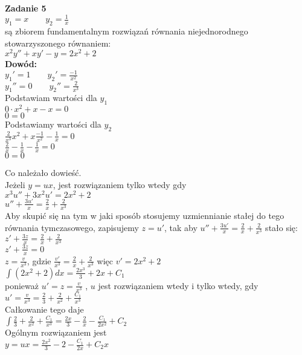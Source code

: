 \documentclass[10pt,a4paper]{article}
\begin{document}
	\newpage

	\textbf{Zadanie 5} \\
	$y_{1} = x \qquad y_{2} = \frac{1}{x} $ \\
	są zbiorem fundamentalnym rozwiązań równania niejednorodnego stowarzyszonego równaniem: \\
	$x^2y'' + xy' - y = 2x^2 + 2 $ \\
	
	\textbf{Dowód:} \\
	$y_{1}' = 1 \qquad y_{2}' = \frac{-1}{x^2} $ \\
	$y_{1}'' = 0 \qquad y_{2}'' = \frac{2}{x^3} $ \\ 
	
	Podstawiam  wartości dla $y_{1} $ \\
	$0 \cdot x^2 + x - x = 0$ \\
	$ 0 = 0 $\\
	Podstawiamy wartości dla $y_{2}$ \\
	$\frac{2}{x^3}x^2 + x\frac{-1}{x^2} - \frac{1}{x} = 0$\\
	$\frac{2}{x} - \frac{1}{x} - \frac{1}{x} = 0$\\ 
	$ 0 = 0 $  
	
	Co należało dowieść. \\
	Jeżeli $ y = ux$, jest rozwiązaniem tylko wtedy gdy \\
	$x^3u'' + 3x^2u' = 2x^2 + 2 $ \\
	$u'' + \frac{3u'}{x} = \frac{2}{x} + \frac{2}{x^3}$ \\
	
	Aby skupić się na tym w jaki sposób stosujemy uzmiennianie stałej do tego równania tymczasowego, zapisujemy $z = u'$, tak aby $u'' + \frac{3u'}{x} = \frac{2}{x} + \frac{2}{x^3}$ stało się: \\
	$z' + \frac{3z}{x} = \frac{2}{x} + \frac{2}{x^3}$ \\
	$z' + \frac{3z}{x} = 0 $ \\
	$z = \frac{v}{x^3} $, gdzie $\frac{v'}{x^3} = \frac{2}{x} + \frac{2}{x^3} $ więc $v' = 2x^2 + 2$ \\
	$\int (2x^2 + 2) dx = \frac{2x^3}{3} + 2x + C_{1} $ \\
	ponieważ $u' = z = \frac{v}{x^3} $ , $u$ jest rozwiązaniem wtedy i tylko wtedy, gdy \\
	$u' = \frac{v}{x^3} = \frac{2}{3} + \frac{2}{x^2} + \frac{C_{1}}{x^3}$ \\
	Całkowanie tego daje \\
	$\int \frac{2}{3} + \frac{2}{x^2} + \frac{C_{1}}{x^3} = \frac{2x}{3} - \frac{2}{x} - \frac{C_{1}}{2x^2} + C_{2} $ \\
	
	Ogólnym rozwiązaniem jest \\
	$y = ux =  \frac{2x^2}{3} - 2 - \frac{C_{1}}{2x} + C_{2}x $ 
	
	
\end{document}
